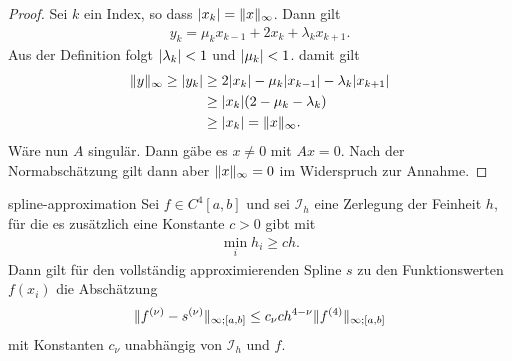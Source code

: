 \begin{proof}
  Sei $k$ ein Index, so dass $\lvert x_k\rvert = \lVert x\rVert_\infty$. Dann gilt
  \begin{gather}
    y_k = \mu_k x_{k-1} + 2 x_{k} + \lambda_k x_{k+1}.
  \end{gather}
  Aus der Definition folgt $\lvert\lambda_k\rvert< 1$ und $\lvert\mu_k\rvert <
  1$. damit gilt
  \begin{align*}
    \lVert y\rVert_{\infty} \ge \lvert y_k\rvert
    &\ge 2 \lvert x_k\rvert - \mu_k \lvert x_{k-1}\rvert - \lambda_k \lvert x_{k+1}\rvert\\
    &\ge \lvert x_k\rvert(2-\mu_k-\lambda_k)\\
    & \ge \lvert x_k\rvert = \lVert x\rVert_\infty.
  \end{align*}
  Wäre nun $A$ singulär. Dann gäbe es $x\neq 0$ mit $Ax = 0$. Nach der
  Normabschätzung gilt dann aber $\lVert x\rVert_\infty = 0$ im Widerspruch
  zur Annahme.
\end{proof}

\begin{Satz}{spline-approximation}
  Sei $f\in C^4[a,b]$ und sei $\mathcal I_h$ eine Zerlegung der
  Feinheit $h$, für die es zusätzlich eine Konstante $c>0$ gibt mit
  \begin{gather}
    \min_{i} h_i \ge c h.
  \end{gather}
  Dann gilt für den vollständig approximierenden Spline $s$ zu den
  Funktionswerten $f(x_i)$ die Abschätzung
  \begin{gather}
    \lVert f^{(\nu)}-s^{(\nu)}\rVert_{\infty;[a,b]}
    \le c_\nu c h^{4-\nu}\lVert f^{(4)}\rVert_{\infty;[a,b]}
  \end{gather}
  mit Konstanten $c_\nu$ unabhängig von $\mathcal I_h$ und $f$.
\end{Satz}

